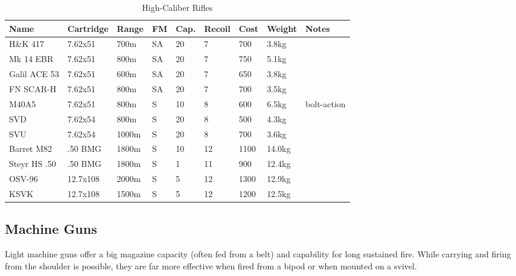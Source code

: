 \begin{table}
  \caption{High-Caliber Rifles}
  \label{tab:Rifles}
  \begin{center}
    \begin{tabular}{| l | l | l | l | l | l | l | l | l |}
      \hline
      \textbf{Name} & \textbf{Cartridge} & \textbf{Range} &
      \textbf{FM} & \textbf{Cap.} & \textbf{Recoil} &
      \textbf{Cost} & \textbf{Weight} & \textbf{Notes} \\ \hline


      H\&K 417      & 7.62x51  &  700m & SA & 20 & 7  &  700 & 3.8kg & \\ \hline
      Mk 14 EBR     & 7.62x51  &  800m & SA & 20 & 7  &  750 & 5.1kg & \\ \hline
      Galil ACE 53  & 7.62x51  &  600m & SA & 20 & 7  &  650 & 3.8kg & \\ \hline
      FN SCAR-H     & 7.62x51  &  800m & SA & 20 & 7  &  700 & 3.5kg & \\ \hline
      M40A5         & 7.62x51  &  800m & S  & 10 & 8  &  600 & 6.5kg & bolt-action \\ \hline

      SVD           & 7.62x54  &  800m & S  & 20 & 8  &  500 & 4.3kg & \\ \hline
      SVU           & 7.62x54  & 1000m & S  & 20 & 8  &  700 & 3.6kg & \\ \hline

      Barret M82    & .50 BMG  & 1800m & S  & 10 & 12 & 1100 & 14.0kg \\ \hline
      Steyr HS .50  & .50 BMG  & 1800m & S  &  1 & 11 &  900 & 12.4kg \\ \hline

      OSV-96        & 12.7x108 & 2000m & S  &  5 & 12 & 1300 & 12.9kg \\ \hline
      KSVK          & 12.7x108 & 1500m & S  &  5 & 12 & 1200 & 12.5kg \\ \hline
    \end{tabular}
  \end{center}
\end{table}


\subsection{Machine Guns}
\label{sub:9-Machine Guns}

Light machine guns offer a big magazine capacity (often fed from a belt) and
capability for long sustained fire. While carrying and firing from the shoulder
is possible, they are far more effective when fired from a bipod or when mounted
on a svivel.

